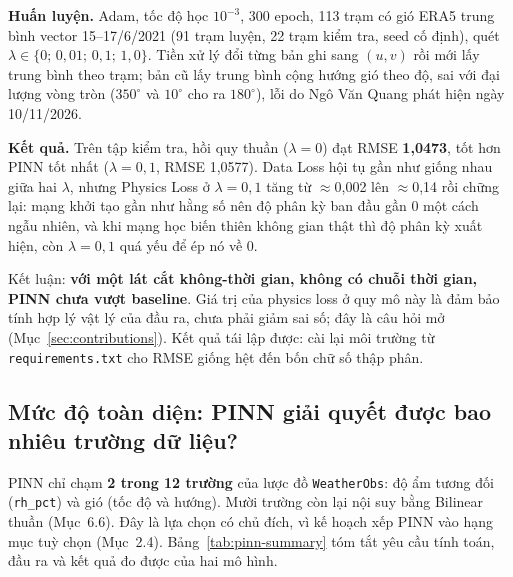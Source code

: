 \documentclass[12pt,a4paper]{report}
\begin{document}
\textbf{Huấn luyện.} Adam, tốc độ học $10^{-3}$, 300 epoch, 113 trạm có gió ERA5 trung bình vector
15--17/6/2021 (91 trạm luyện, 22 trạm kiểm tra, seed cố định), quét
$\lambda \in \{0;\,0{,}01;\,0{,}1;\,1{,}0\}$. Tiền xử lý đổi từng bản ghi sang $(u,v)$ rồi mới lấy
trung bình theo trạm; bản cũ lấy trung bình cộng hướng gió theo độ, sai với đại lượng vòng tròn
($350^\circ$ và $10^\circ$ cho ra $180^\circ$), lỗi do Ngô Văn Quang phát hiện ngày 10/11/2026.

\textbf{Kết quả.} Trên tập kiểm tra, hồi quy thuần ($\lambda=0$) đạt RMSE \textbf{1,0473}, tốt hơn PINN
tốt nhất ($\lambda=0{,}1$, RMSE 1,0577). Data Loss hội tụ gần như giống nhau giữa hai $\lambda$, nhưng
Physics Loss ở $\lambda=0{,}1$ tăng từ $\approx$0,002 lên $\approx$0,14 rồi chững lại: mạng khởi tạo
gần như hằng số nên độ phân kỳ ban đầu gần 0 một cách ngẫu nhiên, và khi mạng học biến thiên không gian
thật thì độ phân kỳ xuất hiện, còn $\lambda=0{,}1$ quá yếu để ép nó về 0.

Kết luận: \textbf{với một lát cắt không-thời gian, không có chuỗi thời gian, PINN chưa vượt baseline}.
Giá trị của physics loss ở quy mô này là đảm bảo tính hợp lý vật lý của đầu ra, chưa phải giảm sai số;
đây là câu hỏi mở (Mục~\ref{sec:contributions}). Kết quả tái lập được: cài lại môi trường từ
\texttt{requirements.txt} cho RMSE giống hệt đến bốn chữ số thập phân.

\subsection{Mức độ toàn diện: PINN giải quyết được bao nhiêu trường dữ liệu?}

PINN chỉ chạm \textbf{2 trong 12 trường} của lược đồ \texttt{WeatherObs}: độ ẩm tương đối
(\texttt{rh\_pct}) và gió (tốc độ và hướng). Mười trường còn lại nội suy bằng Bilinear thuần
(Mục~6.6). Đây là lựa chọn có chủ đích, vì kế hoạch xếp PINN vào hạng mục tuỳ chọn (Mục~2.4).
Bảng~\ref{tab:pinn-summary} tóm tắt yêu cầu tính toán, đầu ra và kết quả đo được của hai mô hình.
\end{document}
